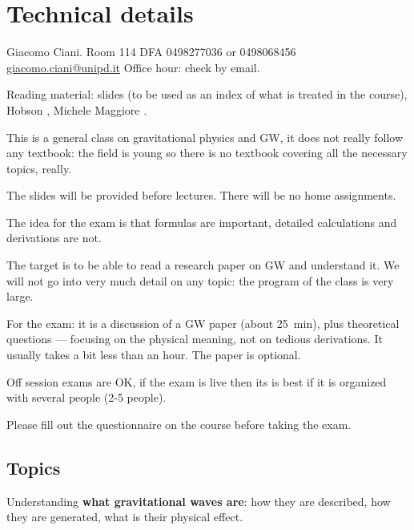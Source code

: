 \documentclass[main.tex]{subfiles}
\begin{document}

\section{Technical details}

Giacomo Ciani. Room 114 DFA
0498277036 or 0498068456
\url{giacomo.ciani@unipd.it}
Office hour: check by email.

Reading material: slides (to be used as an index of what is treated in the course), Hobson \cite[]{hobsonGeneralRelativityIntroduction2006a}, Michele Maggiore \cite[]{maggioreGravitationalWavesVolume2007,maggioreGravitationalWavesVolume2018}.

This is a general class on gravitational physics and GW, it does not really follow any textbook:
the field is young so there is no textbook covering all the necessary topics, really. 

The slides will be provided before lectures. There will be no home assignments. 

The idea for the exam is that formulas are important, detailed calculations and derivations are not. 

The target is to be able to read a research paper on GW and understand it. 
We will not go into very much detail on any topic:
the program of the class is very large. 

For the exam: it is a discussion of a GW paper (about \SI{25}{min}), plus theoretical questions --- focusing on the physical meaning, not on tedious derivations. It usually takes a bit less than an hour. 
The paper is optional. 

Off session exams are OK, if the exam is live then its is best if it is organized with several people (2-5 people). 

Please fill out the questionnaire on the course before taking the exam. 

\subsection{Topics}

Understanding \textbf{what gravitational waves are}: how they are described, how they are generated, what is their physical effect. 

\end{document}
